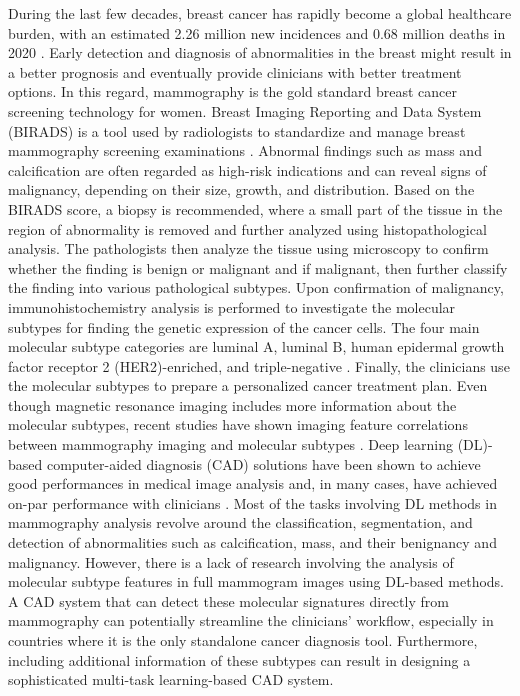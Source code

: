 \documentclass{article}
\begin{document}
During the last few decades, breast cancer has rapidly become a global healthcare burden, with an estimated 2.26 million new incidences and 0.68 million deaths in 2020 \cite{globocan}. Early detection and diagnosis of abnormalities in the breast might result in a better prognosis and eventually provide clinicians with better treatment options. In this regard, mammography is the gold standard breast cancer screening technology for women. Breast Imaging Reporting and Data System (BIRADS) is a tool used by radiologists to standardize and manage breast mammography screening examinations \cite{birads}. Abnormal findings such as mass and calcification are often regarded as high-risk indications and can reveal signs of malignancy, depending on their size, growth, and distribution. Based on the BIRADS score, a biopsy is recommended, where a small part of the tissue in the region of abnormality is removed and further analyzed using histopathological analysis. The pathologists then analyze the tissue using microscopy to confirm whether the finding is benign or malignant and if malignant, then further classify the finding into various pathological subtypes. Upon confirmation of malignancy, immunohistochemistry analysis is performed to investigate the molecular subtypes for finding the genetic expression of the cancer cells. The four main molecular subtype categories are luminal A, luminal B, human epidermal growth factor receptor 2 (HER2)-enriched, and triple-negative \cite {horvath2021molecular, cho2016molecular, boisserie2013correlation}. Finally, the clinicians use the molecular subtypes to prepare a personalized cancer treatment plan. Even though magnetic resonance imaging includes more information about the molecular subtypes, recent studies have shown imaging feature correlations between mammography imaging and molecular subtypes \cite {horvath2021molecular, cho2016molecular, boisserie2013correlation}.  
Deep learning (DL)-based computer-aided diagnosis (CAD) solutions have been shown to achieve good performances in medical image analysis and, in many cases, have achieved on-par performance with clinicians \cite{nagendran2020artificial}. Most of the tasks involving DL methods in mammography analysis revolve around the classification, segmentation, and detection of abnormalities such as calcification, mass, and their benignancy and malignancy. However, there is a lack of research involving the analysis of molecular subtype features in full mammogram images using DL-based methods. A CAD system that can detect these molecular signatures directly from mammography can potentially streamline the clinicians' workflow, especially in countries where it is the only standalone cancer diagnosis tool. Furthermore, including additional information of these subtypes can result in designing a sophisticated multi-task learning-based CAD system. 
\end{document}

